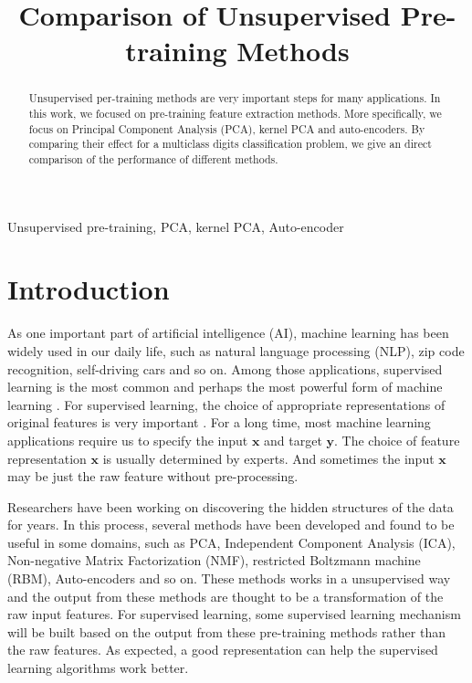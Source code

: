 \documentclass[tikz, multi,dvipsnames,svgnames,x11names]{article}
\title{Comparison of Unsupervised Pre-training Methods}
\begin{document}
\maketitle

\begin{abstract}
Unsupervised per-training methods are very important steps for many applications. In this work, we focused on pre-training feature extraction methods. More specifically, we focus on Principal Component Analysis (PCA), kernel PCA and auto-encoders. By comparing their effect for a multiclass digits classification problem, we give an direct comparison of the performance of different methods.
\end{abstract}

\begin{keywords}
Unsupervised pre-training, PCA, kernel PCA, Auto-encoder
\end{keywords}

\section{Introduction}
\label{sec:intro}

As one important part of artificial intelligence (AI), machine learning has been widely used in our daily life, such as natural language processing (NLP), zip code recognition, self-driving cars and so on. Among those applications, supervised learning is the most common and perhaps the most powerful form of machine learning \cite{lecun2015deep}. For supervised learning, the choice of appropriate representations of original features is very important \cite{bengio2012deep}. For a long time, most machine learning applications require us to specify the input $\bm{x}$ and target $\bm{y}$. The choice of feature representation $\bm{x}$ is usually determined by experts. And sometimes the input $\bm{x}$ may be just the raw feature without pre-processing. 

Researchers have been working on discovering the hidden structures of the data for years. In this process, several methods have been developed and found to be useful in some domains, such as PCA, Independent Component Analysis (ICA), Non-negative Matrix Factorization (NMF), restricted Boltzmann machine (RBM), Auto-encoders and so on. These methods works in a unsupervised way and the output from these methods are thought to be a transformation of the raw input features. For supervised learning, some supervised learning mechanism will be built based on the output from these pre-training methods rather than the raw features. As expected, a good representation can help the supervised learning algorithms work better.
\end{document}
